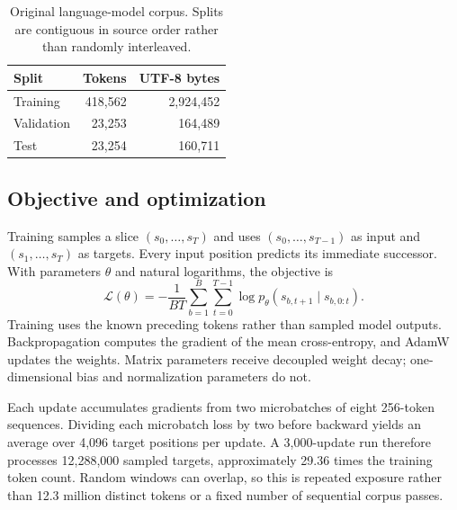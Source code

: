 \documentclass{article}
\begin{document}
\begin{table}[ht]
\caption{Original language-model corpus. Splits are contiguous in source order rather than randomly interleaved.}
\label{tab:splits}\centering\small
\begin{tabular}{lrr}
\toprule Split & Tokens & UTF-8 bytes \\
\midrule
Training & 418,562 & 2,924,452 \\
Validation & 23,253 & 164,489 \\
Test & 23,254 & 160,711 \\
\bottomrule
\end{tabular}
\end{table}

\subsection{Objective and optimization}
Training samples a slice $(s_0,\ldots,s_T)$ and uses $(s_0,\ldots,s_{T-1})$ as input and $(s_1,\ldots,s_T)$ as targets. Every input position predicts its immediate successor. With parameters $\theta$ and natural logarithms, the objective is
\begin{equation}
\mathcal{L}(\theta)=-\frac{1}{BT}\sum_{b=1}^{B}\sum_{t=0}^{T-1}
\log p_\theta(s_{b,t+1}\mid s_{b,0:t}).
\label{eq:loss}
\end{equation}
Training uses the known preceding tokens rather than sampled model outputs. Backpropagation computes the gradient of the mean cross-entropy, and AdamW~\cite{adamw} updates the weights. Matrix parameters receive decoupled weight decay; one-dimensional bias and normalization parameters do not.

Each update accumulates gradients from two microbatches of eight 256-token sequences. Dividing each microbatch loss by two before backward yields an average over 4,096 target positions per update. A 3,000-update run therefore processes 12,288,000 sampled targets, approximately 29.36 times the training token count. Random windows can overlap, so this is repeated exposure rather than 12.3 million distinct tokens or a fixed number of sequential corpus passes.
\end{document}
